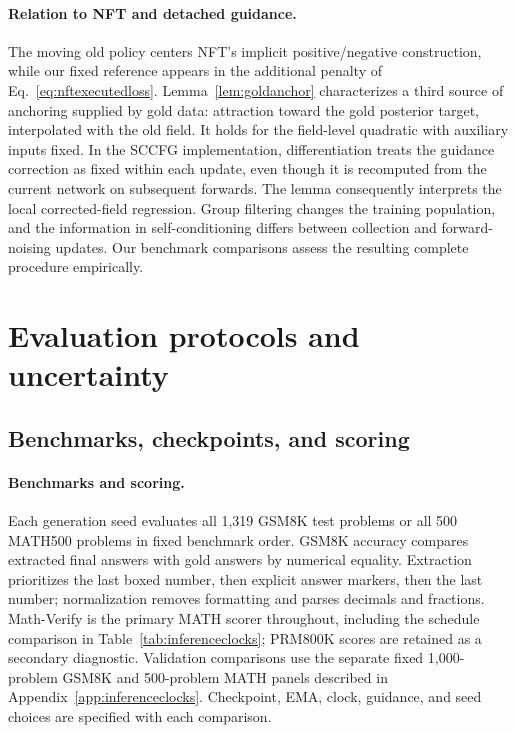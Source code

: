 \documentclass[11pt,letterpaper]{article}
\begin{document}
\paragraph{Relation to NFT and detached guidance.}
The moving old policy centers NFT's implicit positive/negative construction, while our fixed reference appears in the additional penalty of Eq.~\eqref{eq:nftexecutedloss}. Lemma~\ref{lem:goldanchor} characterizes a third source of anchoring supplied by gold data: attraction toward the gold posterior target, interpolated with the old field. It holds for the field-level quadratic with auxiliary inputs fixed. In the SCCFG implementation, differentiation treats the guidance correction as fixed within each update, even though it is recomputed from the current network on subsequent forwards. The lemma consequently interprets the local corrected-field regression. Group filtering changes the training population, and the information in self-conditioning differs between collection and forward-noising updates. Our benchmark comparisons assess the resulting complete procedure empirically.

\section{Evaluation protocols and uncertainty}
\label{app:experimentdetails}

\subsection{Benchmarks, checkpoints, and scoring}

\paragraph{Benchmarks and scoring.}
Each generation seed evaluates all 1,319 GSM8K test problems or all 500 MATH500 problems in fixed benchmark order. GSM8K accuracy compares extracted final answers with gold answers by numerical equality. Extraction prioritizes the last boxed number, then explicit answer markers, then the last number; normalization removes formatting and parses decimals and fractions. Math-Verify is the primary MATH scorer throughout, including the schedule comparison in Table~\ref{tab:inferenceclocks}; PRM800K scores are retained as a secondary diagnostic. Validation comparisons use the separate fixed 1,000-problem GSM8K and 500-problem MATH panels described in Appendix~\ref{app:inferenceclocks}. Checkpoint, EMA, clock, guidance, and seed choices are specified with each comparison.
\end{document}
